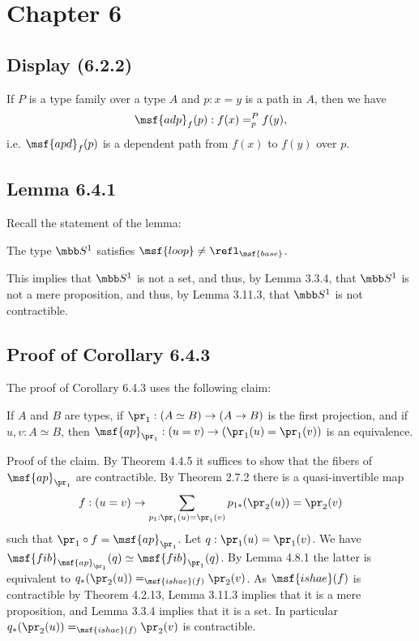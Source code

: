 \documentclass[12pt]{article}
\begin{document}

\section{Chapter 6}

\subsection{Display (6.2.2)}

If $P$ is a type family over a type $A$ and $p:x=y$ is a path in $A$, then we have 
$$
\msf{adp}_f(p):f(x)=^P_pf(y),
$$ 
i.e. $\msf{apd}_f(p)$ is a dependent path from $f(x)$ to $f(y)$ over $p$.


\subsection{Lemma 6.4.1}

Recall the statement of the lemma:

The type $\mbb S^1$ satisfies $\msf{loop}\neq\refl_{\msf{base}}$. 

This implies that $\mbb S^1$ is not a set, and thus, by Lemma 3.3.4, that $\mbb S^1$ is not a mere proposition, and thus, by Lemma 3.11.3, that $\mbb S^1$ is not contractible.


\subsection{Proof of Corollary 6.4.3} %


The proof of Corollary 6.4.3 uses the following claim:

\nn If $A$ and $B$ are types, if $\pr_1:(A\simeq B)\to(A\to B)$ is the first projection, and if $u,v:A\simeq B$, then $\msf{ap}_{\pr_1}:(u=v)\to(\pr_1(u)=\pr_1(v))$ is an equivalence.

\nn Proof of the claim. By Theorem 4.4.5 it suffices to show that the fibers of $\msf{ap}_{\pr_1}$ are contractible. By Theorem 2.7.2 there is a quasi-invertible map 
$$
f:(u=v)\to\sum_{p_1:\pr_1(u)=\pr_1(v)}p_{1*}(\pr_2(u))=\pr_2(v)
$$ 
such that $\pr_1\circ f=\msf{ap}_{\pr_1}$. Let $q:\pr_1(u)=\pr_1(v)$. We have $\msf{fib}_{\msf{ap}_{\pr_1}}(q)\simeq\msf{fib}_{\pr_1}(q)$. By Lemma 4.8.1 the latter is equivalent to $q_*(\pr_2(u))=_{\msf{ishae}(f)}\pr_2(v)$. As $\msf{ishae}(f)$ is contractible by Theorem 4.2.13, Lemma 3.11.3 implies that it is a mere proposition, and Lemma 3.3.4 implies that it is a set. In particular $q_*(\pr_2(u))=_{\msf{ishae}(f)}\pr_2(v)$ is contractible.
\end{document}
